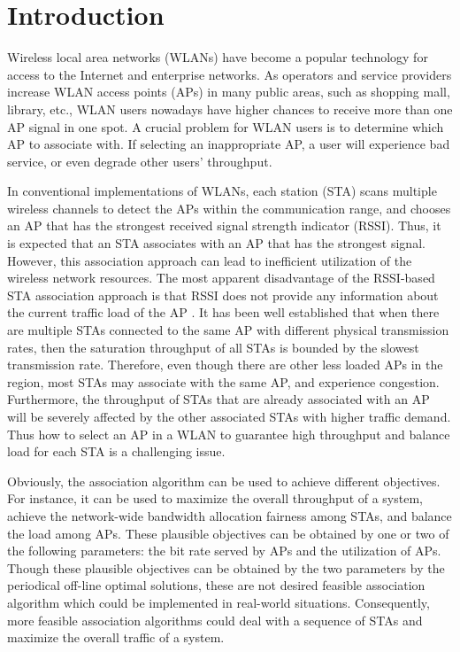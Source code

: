 \documentclass[conference]{IEEEtran}
\begin{document}
\section{Introduction}
 Wireless local area networks (WLANs) have become a popular technology for access to the Internet and enterprise networks. As operators and service providers increase WLAN access points (APs) in many public areas, such as shopping mall, library, etc., WLAN users nowadays have higher chances to receive more than one AP signal in one spot. A crucial problem for WLAN users is to determine which AP to associate with. If selecting an inappropriate AP, a user will experience bad service, or even degrade other users' throughput\cite{alfaqawi2016adaptive}.

  In conventional implementations of WLANs, each station (STA) scans multiple wireless channels to detect the APs within the communication range, and chooses an AP that has the strongest received signal strength indicator (RSSI). Thus, it is expected that an STA associates with an AP that has the strongest signal. However, this association approach can lead to inefficient utilization of the wireless network resources. The most apparent disadvantage of the RSSI-based STA association approach is that RSSI does not provide any information about the current traffic load of the AP \cite{he2010design}. It has been well established that when there are multiple STAs connected to the same AP with different physical transmission rates, then the saturation throughput of all STAs is bounded by the slowest transmission rate. Therefore, even though there are other less loaded APs in the region, most STAs may associate with the same AP, and experience congestion\cite{xu2010designing}. Furthermore, the throughput of STAs that are already associated with an AP will be severely affected by the other associated STAs with higher traffic demand. Thus how to select an AP in a WLAN to guarantee high throughput and balance load for each STA is a challenging issue\cite{kim2010alpha}.

  Obviously, the association algorithm can be used to achieve different objectives.  For instance, it can be used to maximize the overall throughput of a system\cite{nassiri2008novel}, achieve the network-wide bandwidth allocation fairness among STAs\cite{bredel2009understanding}, and balance the load\cite{lin2017adaptive} among APs.  These plausible objectives can be obtained by one or two of the following parameters: the bit rate served by APs and the utilization of APs.  Though these plausible objectives can be obtained by the two parameters by the periodical off-line optimal solutions, these are not desired feasible association algorithm which could be implemented in real-world situations.  Consequently, more feasible association algorithms could deal with a sequence of STAs and maximize the overall traffic of a system\cite{sang2017client}.
\end{document}

